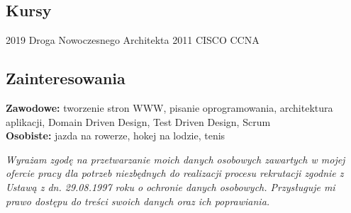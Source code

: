 \documentclass[]{friggeri-cv} %
\begin{document}
	\begin{absolutelynopagebreak}
		\section{Kursy}
		\begin{entrylist}
			\cert
			{2019}
			{Droga Nowoczesnego Architekta}
			\cert
			{2011}
			{CISCO CCNA}
		\end{entrylist}
	\end{absolutelynopagebreak}
	
	\begin{absolutelynopagebreak}
		\section{Zainteresowania}
		\textbf{Zawodowe: } tworzenie stron WWW, pisanie oprogramowania, architektura aplikacji, Domain Driven Design, Test Driven Design, Scrum\\
		\textbf{Osobiste: } jazda na rowerze, hokej na lodzie, tenis
	\end{absolutelynopagebreak}
	
	\vfill
	\textit{Wyrażam zgodę na przetwarzanie moich danych osobowych zawartych w mojej ofercie pracy dla potrzeb niezbędnych do realizacji procesu rekrutacji zgodnie z Ustawą z dn. 29.08.1997 roku o ochronie danych osobowych. Przysługuje mi prawo dostępu do treści swoich danych oraz ich poprawiania.}
	
\end{document}
